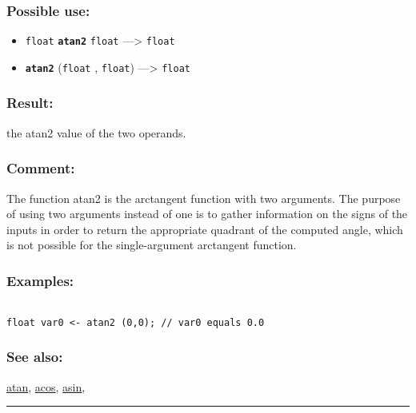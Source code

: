 \documentclass[]{book}
\providecommand{\tightlist}{%
  \setlength{\itemsep}{0pt}\setlength{\parskip}{0pt}}
\theoremstyle{definition}
\theoremstyle{definition}
\theoremstyle{definition}
\theoremstyle{remark}
\begin{document}
\subsubsection{Possible use:}\label{possible-use-60}

\begin{itemize}
\tightlist
\item
  \texttt{float} \textbf{\texttt{atan2}} \texttt{float}
  ---\textgreater{} \texttt{float}
\item
  \textbf{\texttt{atan2}} (\texttt{float} , \texttt{float})
  ---\textgreater{} \texttt{float}
\end{itemize}

\subsubsection{Result:}\label{result-59}

the atan2 value of the two operands.

\subsubsection{Comment:}\label{comment-14}

The function atan2 is the arctangent function with two arguments. The
purpose of using two arguments instead of one is to gather information
on the signs of the inputs in order to return the appropriate quadrant
of the computed angle, which is not possible for the single-argument
arctangent function.

\subsubsection{Examples:}\label{examples-50}

\begin{verbatim}
 
float var0 <- atan2 (0,0); // var0 equals 0.0
\end{verbatim}

\subsubsection{See also:}\label{see-also-42}

\href{OperatorsAA\#atan}{atan}, \href{OperatorsAA\#acos}{acos},
\href{OperatorsAA\#asin}{asin},

\begin{center}\rule{0.5\linewidth}{\linethickness}\end{center}
\end{document}
